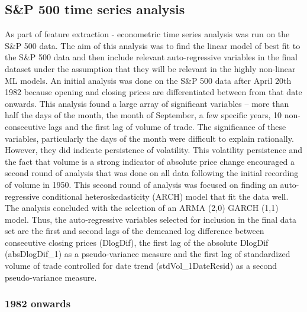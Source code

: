 \documentclass[11pt,preprint, authoryear]{elsarticle}
\numberwithin{equation}{section}
\numberwithin{figure}{section}
\numberwithin{table}{section}
\begin{document}
\hypertarget{sp-500-time-series-analysis}{%
\subsection{S\&P 500 time series
analysis}\label{sp-500-time-series-analysis}}

As part of feature extraction - econometric time series analysis was run
on the S\&P 500 data. The aim of this analysis was to find the linear
model of best fit to the S\&P 500 data and then include relevant
auto-regressive variables in the final dataset under the assumption that
they will be relevant in the highly non-linear ML models. An initial
analysis was done on the S\&P 500 data after April 20th 1982 because
opening and closing prices are differentiated between from that date
onwards. This analysis found a large array of significant variables --
more than half the days of the month, the month of September, a few
specific years, 10 non-consecutive lags and the first lag of volume of
trade. The significance of these variables, particularly the days of the
month were difficult to explain rationally. However, they did indicate
persistence of volatility. This volatility persistence and the fact that
volume is a strong indicator of absolute price change encouraged a
second round of analysis that was done on all data following the initial
recording of volume in 1950. This second round of analysis was focused
on finding an auto-regressive conditional heteroskedasticity (ARCH)
model that fit the data well. The analysis concluded with the selection
of an ARMA (2,0) GARCH (1,1) model. Thus, the auto-regressive variables
selected for inclusion in the final data set are the first and second
lags of the demeaned log difference between consecutive closing prices
(DlogDif), the first lag of the absolute DlogDif (absDlogDif\_1) as a
pseudo-variance measure and the first lag of standardized volume of
trade controlled for date trend (stdVol\_1DateResid) as a second
pseudo-variance measure.

\hypertarget{onwards}{%
\subsubsection{\texorpdfstring{1982 onwards
\label{1982}}{1982 onwards }}\label{onwards}}
\end{document}
